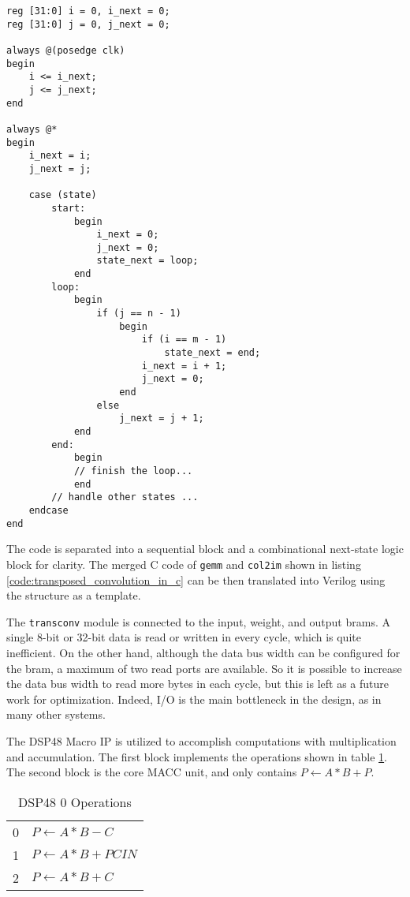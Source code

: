 \begin{code}
\begin{verbatim}
reg [31:0] i = 0, i_next = 0;
reg [31:0] j = 0, j_next = 0;

always @(posedge clk)
begin
    i <= i_next;
    j <= j_next;
end

always @*
begin
    i_next = i;
    j_next = j;

    case (state)
        start:
            begin
                i_next = 0;
                j_next = 0;
                state_next = loop;
            end
        loop:
            begin
                if (j == n - 1)
                    begin
                        if (i == m - 1)
                            state_next = end;
                        i_next = i + 1;
                        j_next = 0;
                    end
                else
                    j_next = j + 1;
            end
        end:
            begin
            // finish the loop...
            end
        // handle other states ...
    endcase
end
\end{verbatim}
\label{code:simple_for_verilog}
\end{code}

The code is separated into a sequential block and a combinational next-state logic block for clarity.
The merged C code of \texttt{gemm} and \texttt{col2im} shown in listing
\ref{code:transposed_convolution_in_c} can be then translated into Verilog using the structure
as a template.

The \texttt{transconv} module is connected to the input, weight, and output \glspl{bram}. A single
8-bit or 32-bit data is read or written in every cycle, which is quite inefficient. On the other hand,
although the data bus width can be configured for the \gls{bram}, a maximum of two read ports are available.
So it is possible to increase the data bus width to read more bytes in each cycle, but this is left
as a future work for optimization. Indeed, I/O is the main bottleneck in the design, as in many other systems.

The DSP48 Macro IP is utilized to accomplish computations with multiplication and accumulation. The first
block implements the operations shown in table \ref{table:dsp48_0_operations}. The second block is the core
MACC unit, and only contains $P \leftarrow A*B+P$.

\begin{table}[h]
  \centering
  \caption{DSP48 0 Operations}
  \begin{tabular}{l | l}
    0 & $P \leftarrow A*B-C$ \\
    1 & $P \leftarrow A*B+PCIN$ \\
    2 & $P \leftarrow A*B+C$
  \end{tabular}
  \label{table:dsp48_0_operations}
\end{table}

